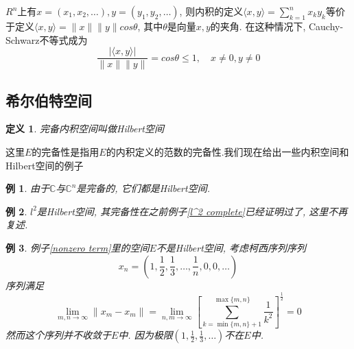 \documentclass[a4paper,11pt]{book}
\newtheorem{definition}{\hspace{2em}定义}[section]
\newtheorem{example}{例}[section]
\begin{document}
$R^n$上有$x=(x_1,x_2,\dots),y=(y_1,y_2,\dots)$, 则内积的定义$\langle x,y\rangle=\sum_{k=1}^{n}x_ky_k$等价于定义$\langle x,y\rangle=\|x\|\|y\|cos\theta$, 其中$\theta$是向量$x,y$的夹角. 在这种情况下, Cauchy-Schwarz不等式成为
\begin{equation*}
  \frac{|\langle x,y\rangle|}{\|x\|\|y\|}=cos\theta\leq 1,\quad x\neq0,y\neq0
\end{equation*}
\subsection*{希尔伯特空间}
\begin{definition}
  完备内积空间叫做Hilbert空间
\end{definition}
这里$E$的完备性是指用$E$的内积定义的范数的完备性.我们现在给出一些内积空间和Hilbert空间的例子
\begin{example}
  由于$\mathbb{C}$与$\mathbb{C}^n$是完备的, 它们都是Hilbert空间.
\end{example}
\begin{example}
  $l^2$是Hilbert空间, 其完备性在之前例子\ref{l^2 complete}已经证明过了, 这里不再复述.
\end{example}
\begin{example}
  例子\ref{nonzero term}里的空间$E$不是Hilbert空间, 考虑柯西序列序列
  \begin{equation*}
    x_n=(1,\frac{1}{2},\frac{1}{3},\dots,\frac{1}{n},0,0,\dots)
  \end{equation*}
  序列满足
  \begin{equation*}
    \lim_{m,n\to\infty}\|x_m-x_m\|=\lim_{n,m\to\infty}\left[\sum_{k=\min{\{m,n\}+1}}^{\max\{m,n\}}\frac{1}{k^2}\right]^{\frac{1}{2}}=0
  \end{equation*}
  然而这个序列并不收敛于$E$中. 因为极限$(1,\frac{1}{2},\frac{1}{3},\dots)$不在$E$中.
\end{example}
\end{document}
